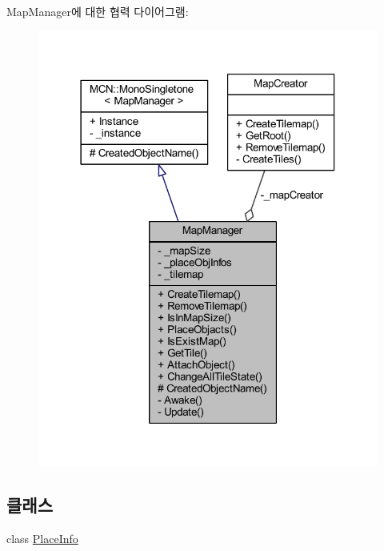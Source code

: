 Map\+Manager에 대한 협력 다이어그램\+:\nopagebreak
\begin{figure}[H]
\begin{center}
\leavevmode
\includegraphics[width=318pt]{class_map_manager__coll__graph}
\end{center}
\end{figure}
\subsection*{클래스}
\begin{DoxyCompactItemize}
\item 
class \hyperlink{class_map_manager_1_1_place_info}{Place\+Info}
\end{DoxyCompactItemize}
